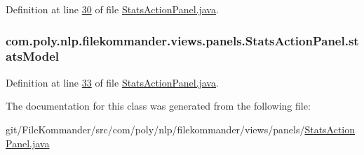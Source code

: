 Definition at line \hyperlink{L30}{30} of file \hyperlink{}{Stats\-Action\-Panel.\-java}.

\hypertarget{classcom_1_1poly_1_1nlp_1_1filekommander_1_1views_1_1panels_1_1_stats_action_panel_aaefc874fb6203949c9a759791eaf06b3}{
\subsubsection[{stats\-Model}]{ com.\-poly.\-nlp.\-filekommander.\-views.\-panels.\-Stats\-Action\-Panel.\-stats\-Model\hspace{0.3cm}{\ttfamily [private]}}}\label{classcom_1_1poly_1_1nlp_1_1filekommander_1_1views_1_1panels_1_1_stats_action_panel_aaefc874fb6203949c9a759791eaf06b3}


Definition at line \hyperlink{L33}{33} of file \hyperlink{}{Stats\-Action\-Panel.\-java}.



The documentation for this class was generated from the following file\-:\begin{DoxyCompactItemize}
\item 
git/\-File\-Kommander/src/com/poly/nlp/filekommander/views/panels/\hyperlink{_stats_action_panel_8java}{Stats\-Action\-Panel.\-java}\end{DoxyCompactItemize}
